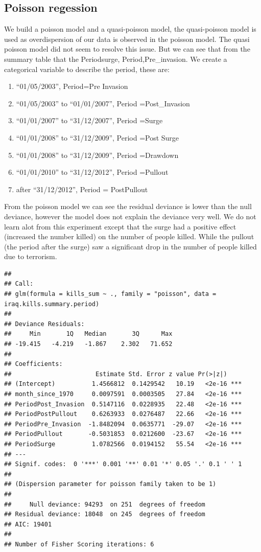 \documentclass[]{article}
\providecommand{\tightlist}{%
  \setlength{\itemsep}{0pt}\setlength{\parskip}{0pt}}
\begin{document}
\subsection{Poisson regession}\label{poisson-regession}

We build a poisson model and a quasi-poisson model, the quasi-poisson
model is used as overdispersion of our data is observed in the poisson
model. The quasi poisson model did not seem to resolve this issue. But
we can see that from the summary table that the Periodsurge,
Period,Pre\_invasion. We create a categorical variable to describe the
period, these are:

\begin{enumerate}
\def\labelenumi{\arabic{enumi}.}
\tightlist
\item
  ``01/05/2003'', Period=Pre Invasion
\item
  ``01/05/2003'' to ``01/01/2007'', Period =Post\_Invasion
\item
  ``01/01/2007'' to ``31/12/2007'', Period =Surge
\item
  ``01/01/2008'' to ``31/12/2009'', Period =Post Surge
\item
  ``01/01/2008'' to ``31/12/2009'', Period =Drawdown
\item
  ``01/01/2010'' to ``31/12/2012'', Period =Pullout
\item
  after ``31/12/2012'', Period = PostPullout
\end{enumerate}

From the poisson model we can see the residual deviance is lower than
the null deviance, however the model does not explain the deviance very
well. We do not learn alot from this experiment except that the surge
had a positive effect (increased the number killed) on the number of
people killed. While the pullout (the period after the surge) saw a
significant drop in the number of people killed due to terrorism.

\begin{verbatim}
## 
## Call:
## glm(formula = kills_sum ~ ., family = "poisson", data = iraq.kills.summary.period)
## 
## Deviance Residuals: 
##     Min       1Q   Median       3Q      Max  
## -19.415   -4.219   -1.867    2.302   71.652  
## 
## Coefficients:
##                       Estimate Std. Error z value Pr(>|z|)    
## (Intercept)          1.4566812  0.1429542   10.19   <2e-16 ***
## month_since_1970     0.0097591  0.0003505   27.84   <2e-16 ***
## PeriodPost_Invasion  0.5147116  0.0228935   22.48   <2e-16 ***
## PeriodPostPullout    0.6263933  0.0276487   22.66   <2e-16 ***
## PeriodPre_Invasion  -1.8482094  0.0635771  -29.07   <2e-16 ***
## PeriodPullout       -0.5031853  0.0212600  -23.67   <2e-16 ***
## PeriodSurge          1.0782566  0.0194152   55.54   <2e-16 ***
## ---
## Signif. codes:  0 '***' 0.001 '**' 0.01 '*' 0.05 '.' 0.1 ' ' 1
## 
## (Dispersion parameter for poisson family taken to be 1)
## 
##     Null deviance: 94293  on 251  degrees of freedom
## Residual deviance: 18048  on 245  degrees of freedom
## AIC: 19401
## 
## Number of Fisher Scoring iterations: 6
\end{verbatim}
\end{document}
